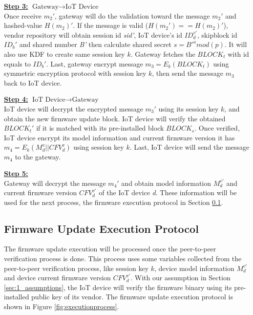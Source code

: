 \noindent \underline{\textbf{Step 3:}} $\text{Gateway}\rightarrow\text{IoT Device}$ \\
\indent Once receive \textit{$m_2'$}, gateway will do the validation toward the message \textit{$m_2'$} and hashed-value \textit{$H(m_2)'$}. If the message is valid (\textit{$H(m_2')==H(m_2)'$}), vendor repository will obtain session id \textit{sid'}, IoT device's id \textit{$ID_d^{v'}$}, skipblock id \textit{$ID_b'$} and shared number \textit{B'} then calculate shared secret \textit{$s=B'^amod(p)$}. It will also use KDF to create same session key \textit{$k$}. Gateway fetches the \textit{$BLOCK_t$} with id equals to \textit{$ID_b'$}. Last, gateway encrypt message \textit{$m_3=E_k(BLOCK_t)$} using symmetric encryption protocol with session key \textit{$k$}, then send the message \textit{$m_3$} back to IoT device.

\noindent \underline{\textbf{Step 4:}} $\text{IoT Device}\rightarrow\text{Gateway}$ \\
\indent IoT device will decrypt the encrypted message \textit{$m_3'$} using its session key \textit{$k$}, and obtain the new firmware update block. IoT device will verify the obtained \textit{$BLOCK_t'$} if it is matched with its pre-installed block \textit{$BLOCK_s$}. Once verified, IoT device encrypt its model information and current firmware version it has \textit{$m_4=E_k(M_d^v||CFV_d^v)$} using session key \textit{$k$}. Last, IoT device will send the message \textit{$m_4$} to the gateway.

\noindent \underline{\textbf{Step 5:}} \\
\indent Gateway will decrypt the message \textit{$m_4'$} and obtain model information \textit{$M_d^{v'}$} and current firmware version \textit{$CFV_d^{v'}$} of the IoT device \textit{d}. These information will be used for the next process, the firmware execution protocol in Section \ref{sec:executionprotocol}.

\subsection{Firmware Update Execution Protocol}
\label{sec:executionprotocol}

The firmware update execution will be processed once the peer-to-peer verification process is done. This process uses some variables collected from the peer-to-peer verification process, like session key \textit{$k$}, device model information \textit{$M_d^{v'}$} and device current firmware version \textit{$CFV_d^{v'}$}. With our assumption in Section \ref{sec:1_assumptions}, the IoT device will verify the firmware binary using its pre-installed public key of its vendor. The firmware update execution protocol is shown in Figure \ref{fig:executionprocess}.

